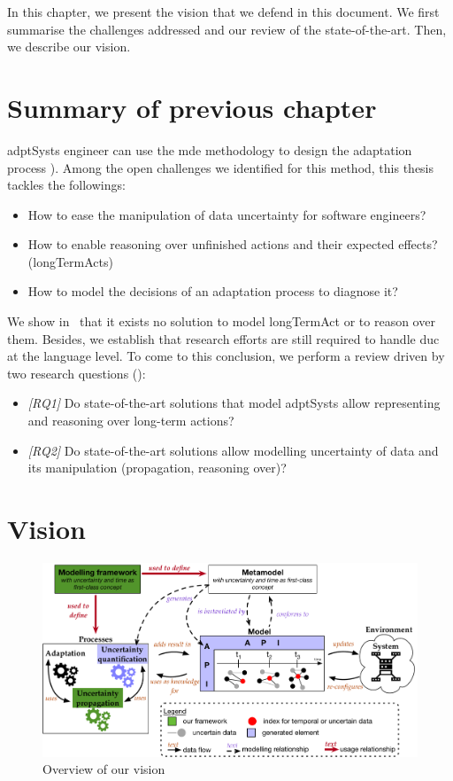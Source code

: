 In this chapter, we present the vision that we defend in this document.
We first summarise the challenges addressed and our review of the state-of-the-art.
Then, we describe our vision.

\section{Summary of previous chapter}
\Glspl{adptSyst} engineer can use the \gls{mde} methodology to design the adaptation process \cf {}).
Among the open challenges we identified for this method, this thesis tackles the followings:
\begin{itemize}
	\item How to ease the manipulation of data uncertainty for software engineers?
	\item How to enable reasoning over unfinished actions and their expected effects? (\glspl{longTermAct})
	\item How to model the decisions of an adaptation process to diagnose it?
\end{itemize}

We show in~ that it exists no solution to model \gls{longTermAct} or to reason over them.
Besides, we establish that research efforts are still required to handle \gls{duc} at the language level.
To come to this conclusion, we perform a review driven by two research questions (\cf {}):
\begin{itemize}
	\item \textit{[RQ1]} Do state-of-the-art solutions that model \glspl{adptSyst} allow representing and reasoning over long-term actions?
	\item \textit{[RQ2]} Do state-of-the-art solutions allow modelling uncertainty of data and its manipulation (propagation, reasoning over)?
\end{itemize}

\section{Vision}
\begin{figure}
	\centering
	\includegraphics[width=\linewidth]{img/chapt-vision/vision}
	\caption{Overview of our vision}
	\label{fig:vision:vision}
\end{figure}

